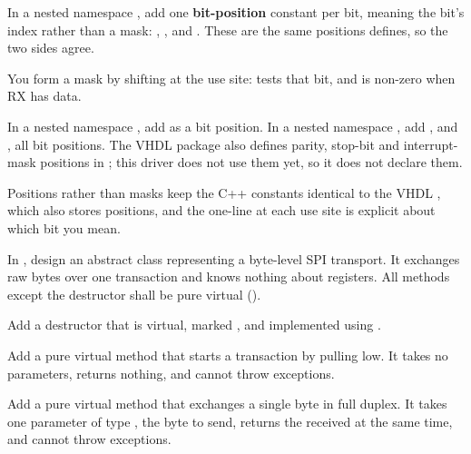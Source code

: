 In a nested namespace , add one  \textbf{bit-position} constant per
 bit, meaning the bit's index rather than a mask: ,
,  and . These are the same positions
 defines, so the two sides agree.

You form a mask by shifting at the use site:  tests that bit, and
 is non-zero when RX has data.

In a nested namespace , add  as a  bit position. In a
nested namespace , add ,  and , all
 bit positions. The VHDL package also defines parity, stop-bit and interrupt-mask
positions in ; this driver does not use them yet, so it does not declare them.

Positions rather than masks keep the C++ constants identical to the VHDL , which
also stores positions, and the one-line  at each use site is explicit about which bit
you mean.

\label{c6:set:2}

\label{c6:ex:2.1}
In , design an abstract class
 representing a byte-level SPI transport. It exchanges raw bytes
over one transaction and knows nothing about registers. All methods except the destructor shall be
pure virtual ().

Add a destructor that is virtual, marked , and implemented using .

Add a pure virtual method  that starts a transaction by pulling  low. It takes
no parameters, returns nothing, and cannot throw exceptions.

Add a pure virtual method  that exchanges a single byte in full duplex. It takes one
parameter of type , the byte to send, returns the  received at the same
time, and cannot throw exceptions.

